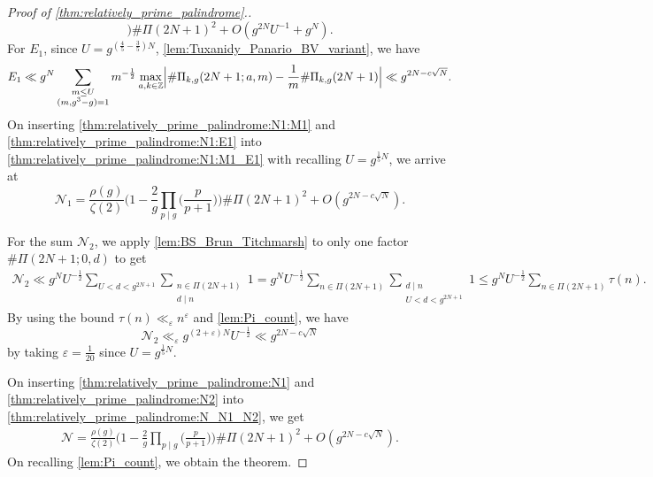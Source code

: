 \documentclass{amsart}
\theoremstyle{plain}
\theoremstyle{definition}
\let\tmp\phi
\let\phi\varphi
\let\varphi\tmp
\let\tmp\epsilon
\let\epsilon\varepsilon
\let\varepsilon\tmp
\begin{document}
\begin{proof}[Proof of \cref{thm:relatively_prime_palindrome}.]
\begin{equation}
\biggr)
\#\Pi(2N+1)^{2}
+
O(g^{2N}U^{-1}+g^{N}).
\end{equation}
For $E_{1}$, since $U=g^{(\frac{4}{5}-\frac{3}{5})N}$,
\cref{lem:Tuxanidy_Panario_BV_variant}, we have
\begin{equation}
\label{thm:relatively_prime_palindrome:N1:E1}
E_{1}
\ll
g^{N}
\sum_{\substack{
m\le U\\
(m,g^{3}-g)=1
}}
m^{-\frac{1}{2}}
\max_{a,k\in\mathbb{Z}}
\Bigl|
\#\Pi_{k,g}(2N+1;a,m)
-
\frac{1}{m}
\#\Pi_{k,g}(2N+1)
\Bigr|
\ll
g^{2N-c\sqrt{N}}.
\end{equation}
On inserting \cref{thm:relatively_prime_palindrome:N1:M1}
and \cref{thm:relatively_prime_palindrome:N1:E1}
into \cref{thm:relatively_prime_palindrome:N1:M1_E1}
with recalling $U=g^{\frac{1}{5}N}$,
we arrive at
\begin{equation}
\label{thm:relatively_prime_palindrome:N1}
\mathscr{N}_{1}
=
\frac{\rho(g)}{\zeta(2)}
\biggl(
1-\frac{2}{g}\prod_{p\mid g}\biggl(\frac{p}{p+1}\biggr)
\biggr)
\#\Pi(2N+1)^{2}
+
O(g^{2N-c\sqrt{N}}).
\end{equation}

For the sum $\mathscr{N}_{2}$, we apply \cref{lem:BS_Brun_Titchmarsh}
to only one factor $\#\Pi(2N+1;0,d)$ to get
\begin{align}
\mathscr{N}_{2}
\ll
g^{N}U^{-\frac{1}{2}}
\sum_{U<d<g^{2N+1}}
\sum_{\substack{
n\in\Pi(2N+1)\\
d\mid n
}}
1
=
g^{N}U^{-\frac{1}{2}}
\sum_{n\in\Pi(2N+1)}
\sum_{\substack{
d\mid n\\
U<d<g^{2N+1}
}}
1
\le
g^{N}U^{-\frac{1}{2}}
\sum_{n\in\Pi(2N+1)}
\tau(n).
\end{align}
By using the bound $\tau(n)\ll_{\epsilon}n^{\epsilon}$
and \cref{lem:Pi_count}, we have
\begin{equation}
\label{thm:relatively_prime_palindrome:N2}
\mathscr{N}_{2}
\ll_{\epsilon}
g^{(2+\epsilon)N}U^{-\frac{1}{2}}
\ll
g^{2N-c\sqrt{N}}
\end{equation}
by taking $\epsilon=\frac{1}{20}$ since $U=g^{\frac{1}{5}N}$.

On inserting \cref{thm:relatively_prime_palindrome:N1} and \cref{thm:relatively_prime_palindrome:N2}
into \cref{thm:relatively_prime_palindrome:N_N1_N2}, we get
\begin{align}
\mathscr{N}
=
\frac{\rho(g)}{\zeta(2)}
\biggl(
1-\frac{2}{g}\prod_{p\mid g}\biggl(\frac{p}{p+1}\biggr)
\biggr)
\#\Pi(2N+1)^{2}
+
O(g^{2N-c\sqrt{N}}).
\end{align}
On recalling \cref{lem:Pi_count},
we obtain the theorem.
\end{proof}
\end{document}
